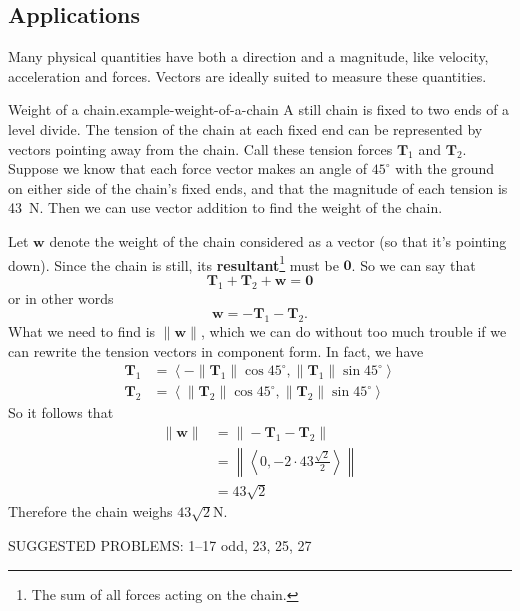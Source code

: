 \documentclass[10pt,]{book}
\newcommand{\terminology}[1]{\textbf{#1}}
\numberwithin{equation}{section}
\newcommand{\vv}[1]{\mathbf{#1}}
\newcommand{\dotprod}[1]{\left\langle #1 \right\rangle}
\begin{document}
\subsection[{Applications}]{Applications}\label{subsection-applications}
\hypertarget{p-1117}{}%
Many physical quantities have both a direction and a magnitude, like velocity, acceleration and forces. Vectors are ideally suited to measure these quantities.%
\begin{example}{Weight of a chain.}{example-weight-of-a-chain}%
\hypertarget{p-1118}{}%
A still chain is fixed to two ends of a level divide. The tension of the chain at each fixed end can be represented by vectors pointing away from the chain. Call these tension forces \(\vv{T}_{1}\) and \(\vv{T}_{2}\). Suppose we know that each force vector makes an angle of \(45^{\circ}\) with the ground on either side of the chain's fixed ends, and that the magnitude of each tension is \SI{43}{\newton}. Then we can use vector addition to find the weight of the chain.%
\par
\hypertarget{p-1119}{}%
Let \(\vv{w}\) denote the weight of the chain considered as a vector (so that it's pointing down). Since the chain is still, its \terminology{resultant}\footnote{The sum of all forces acting on the chain.\label{fn-4}} must be \(\vv{0}\). So we can say that%
%
\begin{equation*}
\vv{T}_{1}+\vv{T}_{2} + \vv{w} = \vv{0}
\end{equation*}
\hypertarget{p-1120}{}%
or in other words%
%
\begin{equation*}
\vv{w} = -\vv{T}_{1}-\vv{T}_{2}.
\end{equation*}
\hypertarget{p-1121}{}%
What we need to find is \(\|\vv{w}\|\), which we can do without too much trouble if we can rewrite the tension vectors in component form. In fact, we have%
%
\begin{align*}
\vv{T}_{1} & = \dotprod{-\|\vv{T}_{1}\|\cos45^{\circ},\|\vv{T}_{1}\|\sin45^{\circ}} \\
\vv{T}_{2} & = \dotprod{\|\vv{T}_{2}\|\cos45^{\circ},\|\vv{T}_{2}\|\sin45^{\circ}} 
\end{align*}
\hypertarget{p-1122}{}%
So it follows that%
%
\begin{align*}
\|\vv{w}\| & = \|-\vv{T}_{1}-\vv{T}_{2}\| \\
& = \left\|\dotprod{0,-2\cdot43\frac{\sqrt{2}}{2}}\right\|\\
& = 43\sqrt{2} 
\end{align*}
\hypertarget{p-1123}{}%
Therefore the chain weighs \(43\sqrt{2}\)\si{\newton}.%
\end{example}
\hypertarget{p-1124}{}%
SUGGESTED PROBLEMS: 1--17 odd, 23, 25, 27%
%
%
\typeout{************************************************}
\typeout{************************************************}
%
\end{document}

